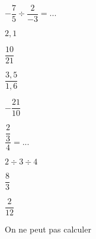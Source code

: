\begin{QCM}
\begin{GroupeQCM}
\begin{exercice}
$-\dfrac{7}{5} \div \dfrac{2}{-3}=...$
\begin{ChoixQCM}{4}
\item $2,1$
\item $\dfrac{10}{21}$
\item $\dfrac{3,5}{1,6}$
\item $-\dfrac{21}{10}$
\end{ChoixQCM}
\begin{corrige}
\end{corrige}
\end{exercice}


\begin{exercice}
$\dfrac{\dfrac{2}{3}}{4}=...$
\begin{ChoixQCM}{4}
\item $2 \div 3 \div 4$
\item $\dfrac{8}{3}$
\item $\dfrac{2}{12}$
\item On ne peut pas calculer
\end{ChoixQCM}
\begin{corrige}
\end{corrige}
\end{exercice}

\end{GroupeQCM}
\end{QCM}
